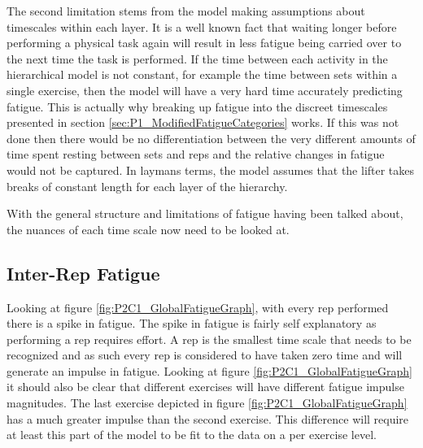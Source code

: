 The second limitation stems from the model making assumptions about timescales within each layer. It is a well known fact that waiting longer before performing a physical task again will result in less fatigue being carried over to the next time the task is performed. If the time between each activity in the hierarchical model is not constant, for example the time between sets within a single exercise, then the model will have a very hard time accurately predicting fatigue. This is actually why breaking up fatigue into the discreet timescales presented in section \ref{sec:P1_ModifiedFatigueCategories} works. If this was not done then there would be no differentiation between the very different amounts of time spent resting between sets and reps and the relative changes in fatigue would not be captured. In laymans terms, the model assumes that the lifter takes breaks of constant length for each layer of the hierarchy.

%

With the general structure and limitations of fatigue having been talked about, the nuances of each time scale now need to be looked at.

\subsection{Inter-Rep Fatigue}
\label{sec:P2C1_InterRepFatigue}

Looking at figure \ref{fig:P2C1_GlobalFatigueGraph}, with every rep performed there is a spike in fatigue. The spike in fatigue is fairly self explanatory as performing a rep requires effort. A rep is the smallest time scale that needs to be recognized and as such every rep is considered to have taken zero time and will generate an impulse in fatigue. Looking at figure \ref{fig:P2C1_GlobalFatigueGraph} it should also be clear that different exercises will have different fatigue impulse magnitudes. The last exercise depicted in figure \ref{fig:P2C1_GlobalFatigueGraph} has a much greater impulse than the second exercise. This difference will require at least this part of the model to be fit to the data on a per exercise level. 

